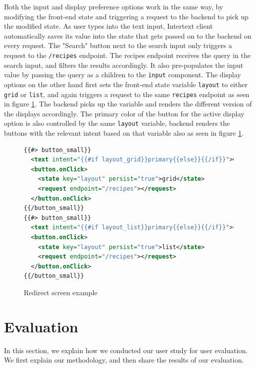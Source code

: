 Both the input and display preference options work in the same way, by modifying the front-end state and triggering a request to the backend to pick up the modified state. As user types into the text input, Intertext client automatically saves its value into the state that gets passed on to the backend on every request. The "Search" button next to the search input only triggers a request to the \texttt{/recipes} endpoint. The recipes endpoint receives the query in the search input, and filters the results accordingly. It also pre-populates the input value by passing the query as a children to the \texttt{input} component. The display options on the other hand first sets the front-end state variable \texttt{layout} to either \texttt{grid} or \texttt{list}, and again triggers a request to the same \texttt{recipes} endpoint as seen in figure \ref{fig:rec_display_options}. The backend picks up the variable and renders the different version of the displays accordingly. The primary color of the button for the active display option is also controlled by the same \texttt{layout} variable, backend renders the buttons with the relevant intent based on that variable also as seen in figure \ref{fig:rec_display_options}.

\begin{figure}[htb]
\begin{minipage}{\linewidth}
\begin{lstlisting}[language=xml]
{{#> button_small}}
  <text intent="{{#if layout_grid}}primary{{else}}{{/if}}">Grid</text>
  <button.onClick>
    <state key="layout" persist="true">grid</state>
    <request endpoint="/recipes"></request>
  </button.onClick>
{{/button_small}}
{{#> button_small}}
  <text intent="{{#if layout_list}}primary{{else}}{{/if}}">List</text>
  <button.onClick>
    <state key="layout" persist="true">list</state>
    <request endpoint="/recipes"></request>
  </button.onClick>
{{/button_small}}
\end{lstlisting}
\end{minipage}
\caption{Redirect screen example}%
\label{fig:rec_display_options}%
\end{figure}


\section{Evaluation}

In this section, we explain how we conducted our user study for user evaluation. We first explain our methodology, and then share the results of our evaluation.

